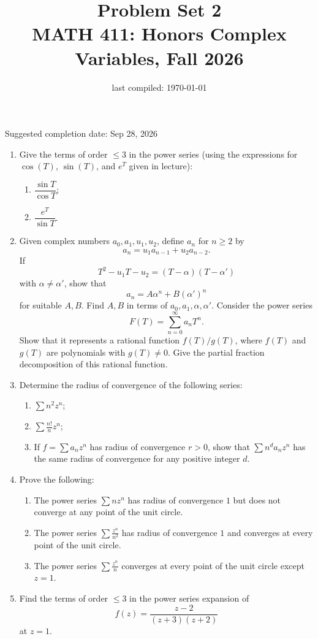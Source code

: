 \documentclass[12pt, reqno]{amsart}
\title{Problem Set 2 \\ MATH 411: Honors Complex Variables, Fall 2026}
\date{last compiled: \today}
\theoremstyle{definition}
\numberwithin{equation}{subsection}
\numberwithin{equation}{section}
\begin{document}
\maketitle
\begin{center}
Suggested completion date: Sep 28, 2026
\end{center}



\begin{enumerate}


\item Give the terms of order $\leq 3$ in the power series (using the expressions for $\cos(T)$, $\sin(T)$, and $e^T$ given in lecture):
\begin{enumerate}
\item $\dfrac{\sin T}{\cos T}$;
\item $\dfrac{e^T}{\sin T}$.
\end{enumerate}

\item Given complex numbers $a_0,a_1,u_1,u_2$, define $a_n$ for $n\geq 2$ by
\[
a_n=u_1a_{n-1}+u_2a_{n-2}.
\]
If
\[
T^2-u_1T-u_2=(T-\alpha)(T-\alpha')
\]
with $\alpha\neq\alpha'$, show that
\[
a_n=A\alpha^n+B(\alpha')^n
\]
for suitable $A,B$. Find $A,B$ in terms of $a_0,a_1,\alpha,\alpha'$. Consider the power series
\[
F(T)=\sum_{n=0}^{\infty}a_nT^n.
\]
Show that it represents a rational function $f(T)/g(T)$, where $f(T)$ and $g(T)$ are polynomials with $g(T)\neq 0$. Give the partial fraction decomposition of this rational function.

\item Determine the radius of convergence of the following series:
\begin{enumerate}
\item $\displaystyle\sum n^2z^n$;
\item $\displaystyle\sum \frac{n!}{n}z^n$;
\item If $f=\sum a_nz^n$ has radius of convergence $r>0$, show that $\sum n^da_nz^n$ has the same radius of convergence for any positive integer $d$.
\end{enumerate}

\item Prove the following:
\begin{enumerate}
\item The power series $\sum nz^n$ has radius of convergence $1$ but does not converge at any point of the unit circle.
\item The power series $\sum \frac{z^n}{n^2}$ has radius of convergence $1$ and converges at every point of the unit circle.
\item The power series $\sum \frac{z^n}{n}$ converges at every point of the unit circle except $z=1$.
\end{enumerate}

\item Find the terms of order $\leq 3$ in the power series expansion of
\[
f(z)=\frac{z-2}{(z+3)(z+2)}
\]
at $z=1$.

\end{enumerate}
\end{document}
